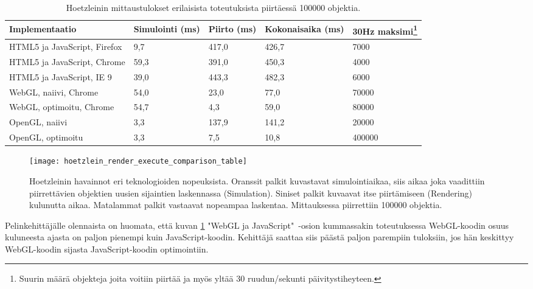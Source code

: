 \begin{table}[h]
    \begin{minipage}{\textwidth}
    \caption{\label{tab:hoetzlein_diff}Hoetzleinin\cite{hoetzlein}\cite{hoetzlein_data} mittaustulokset erilaisista toteutuksista piirtäessä 100000 objektia.}
    \begin{tabular}{ |l|p{2cm}|p{1.1cm}|p{2.5cm}|p{2cm}| }
        \hline
        \textbf{Implementaatio} & \textbf{Simulointi (ms)} & \textbf{Piirto (ms)} & \textbf{Kokonaisaika (ms)} & \textbf{30Hz maksimi\footnote{Suurin määrä objekteja joita voitiin piirtää ja myös yltää 30 ruudun/sekunti päivitystiheyteen.}} \\ \hline
        HTML5 ja JavaScript, Firefox & 9,7 & 417,0 & 426,7 & 7000 \\ \hline
        HTML5 ja JavaScript, Chrome & 59,3 & 391,0 & 450,3 & 4000 \\ \hline
        HTML5 ja JavaScript, IE 9 & 39,0 & 443,3 & 482,3 & 6000 \\ \hline
        WebGL, naiivi, Chrome & 54,0 & 23,0 & 77,0 & 70000 \\ \hline
        WebGL, optimoitu, Chrome & 54,7 & 4,3 & 59,0 & 80000 \\ \hline
        OpenGL, naiivi & 3,3 & 137,9 & 141,2 & 20000 \\ \hline
        OpenGL, optimoitu & 3,3 & 7,5 & 10,8 & 400000 \\ \hline
    \end{tabular}
    \end{minipage}
\end{table}

\begin{figure}[h]
    \texttt{[image: hoetzlein\_render\_execute\_comparison\_table]}
    \caption{\label{fig:hoetzlein_comparison}Hoetzleinin\cite{hoetzlein} havainnot eri teknologioiden nopeuksista. Oranssit palkit kuvastavat simulointiaikaa, siis aikaa joka vaadittiin piirrettävien objektien uusien sijaintien laskennassa (Simulation). Siniset palkit kuvaavat itse piirtämiseen (Rendering) kulunutta aikaa. Matalammat palkit vastaavat nopeampaa laskentaa. Mittauksessa piirrettiin 100000 objektia.}
\end{figure}

Pelinkehittäjälle olennaista on huomata, että kuvan \ref{fig:hoetzlein_comparison} "WebGL ja JavaScript"~-osion kummassakin toteutuksessa WebGL-koodin osuus kuluneesta ajasta on paljon pienempi kuin JavaScript-koodin. Kehittäjä saattaa siis päästä paljon parempiin tuloksiin, jos hän keskittyy WebGL-koodin sijasta JavaScript-koodin optimointiin. 

